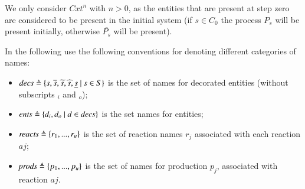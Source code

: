 



We only consider $\mathit{Cxt}^n$ with $n >0$, as the entities  that are present at step zero  are considered to be present in the initial system (if $s\in C_0$ the process $P_s$ will be present initially, otherwise $\overline{P_s}$ will be present).

In the following use the following conventions for denoting different categories of names:
\begin{itemize}
\item
$\mathit{decs} \triangleq \{ s, \overline{s}, \widetilde{s},\widehat{s},\underline{s}~|~ s\in S\}$ is the set of names for decorated entities (without subscripts $_i$ and $_o$);
\item
$\mathit{ents} \triangleq \{ d_i, d_o~|~ d\in \mathit{decs}\}$ is the set names for entities;
\item
$\mathit{reacts}\triangleq \{r_1,...,r_u\}$ is the set of reaction names $r_j$ associated with each reaction $aj$;
\item 
$\mathit{prods}\triangleq \{p_1,...,p_u\}$ is the set of names for production $p_j$, associated with  reaction $aj$.
\end{itemize}




